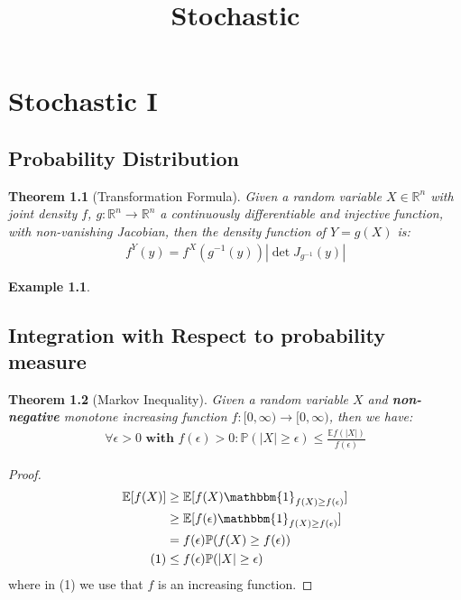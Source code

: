 \documentclass[a4paper,11pt]{book}
\newtheorem{theorem}{Theorem}[section]
\theoremstyle{definition}
\newtheorem*{example}{Example}
\theoremstyle{remark}
\begin{document}
\title{Stochastic}
\chapter{Stochastic I}
\section{Probability Distribution}
\begin{theorem}[Transformation Formula]
Given a random variable $X \in \mathbb{R}^n$ with joint density $f$, $g: \mathbb{R}^n \rightarrow \mathbb{R}^n$ a continuously differentiable and injective function, with non-vanishing Jacobian, then the density function of $Y = g(X)$ is:
\begin{align*}
	f^Y(y) = f^X(g^{-1}(y)) |\det J_{g^{-1}}(y)|
\end{align*}	
\end{theorem}

\begin{example}
\end{example}

\section{Integration with Respect to probability measure}
\begin{theorem}[Markov Inequality]
Given a random variable $X$ and \textbf{non-negative} monotone increasing function $f:[0, \infty) \rightarrow [0, \infty)$, then we have:
\begin{align*}
	\forall \epsilon > 0 \textbf{ with } f(\epsilon) > 0: \mathbb{P}(|X| \geq \epsilon) \leq \frac{\mathbb{E}f(|X|)}{f(\epsilon)}
\end{align*}
\end{theorem}
\begin{proof}
	\begin{align*}
		\mathbb{E}[f(X)] &\geq \mathbb{E}[f(X) \mathbbm{1}_{f(X) \geq f(\epsilon)}]\\
		&\geq \mathbb{E}[f(\epsilon)\mathbbm{1}_{f(X) \geq f(\epsilon)}]\\
		&= f(\epsilon) \mathbb{P}(f(X) \geq f(\epsilon))\\
	(1)	&\leq f(\epsilon)\mathbb{P}(|X| \geq \epsilon)
	\end{align*}
	where in (1) we use that $f$ is an increasing function.
\end{proof}
\end{document}
